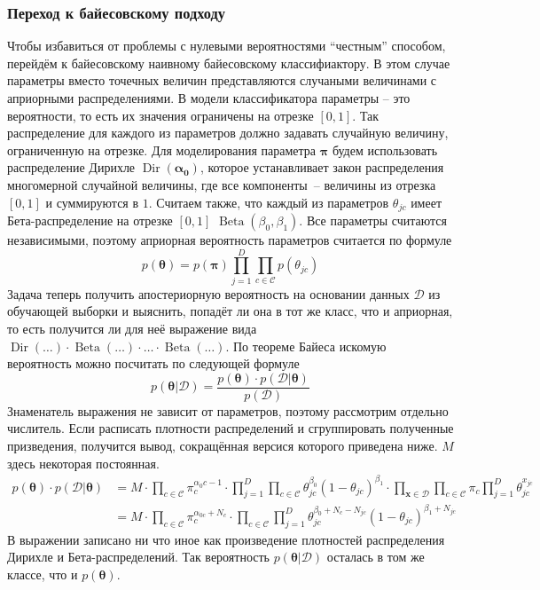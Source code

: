 \subsubsection{Переход к байесовскому подходу}\label{bnb}
Чтобы избавиться от проблемы с нулевыми вероятностями ``честным'' способом, перейдём к байесовскому
наивному байесовскому классифиактору. В этом случае параметры вместо точечных величин представляются
случаными величинами с априорными распределениями. В модели классификатора параметры -- это
вероятности, то есть их значения ограничены на отрезке $[0,1]$. Так распределение для каждого из
параметров должно задавать случайную величину, ограниченную на отрезке. Для моделирования параметра
$\mathbf{\pi}$ будем использовать распределение Дирихле $\operatorname{Dir}(\mathbf{\alpha_0})$, которое
устанавливает закон распределения многомерной случайной величины, где все компоненты~-- величины из
отрезка $[0,1]$ и суммируются в $1$. Считаем также, что каждый из параметров $\theta_{jc}$ имеет
Бета-распределение на отрезке $[0,1]$ $\operatorname{Beta}(\beta_0,\beta_1)$. Все параметры
считаются независимыми, поэтому априорная вероятность параметров считается по формуле
\begin{equation}
  p(\mathbf{\theta}) = p(\mathbf{\pi})\prod_{j=1}^D\prod_{c\in\mathcal{C}}p(\theta_{jc})
  \label{eq:apr}
\end{equation}
Задача теперь получить апостериорную вероятность на основании данных $\mathcal{D}$ из обучающей
выборки и выяснить, попадёт ли она в тот же класс, что и априорная, то есть получится ли для неё
выражение вида
$\operatorname{Dir}(\ldots)\cdot\operatorname{Beta}(\ldots)\cdot\ldots\cdot\operatorname{Beta}(\ldots)$.
По теореме Байеса искомую вероятность можно посчитать по следующей формуле
\begin{equation}
  p(\mathbf{\theta}|\mathcal{D}) =
  \frac{p(\mathbf{\theta})\cdot p(\mathcal{D}|\mathbf{\theta})}{p(\mathcal{D})}
  \label{eq:apo}
\end{equation}
Знаменатель выражения не зависит от параметров, поэтому рассмотрим отдельно числитель. Если
расписать плотности распределений и сгруппировать полученные призведения, получится вывод,
сокращённая версися которого приведена ниже. $M$ здесь некоторая постоянная.
\begin{align}
  p(\mathbf{\theta}) \cdot p(\mathcal{D}|\mathbf{\theta})
  & =  M\cdot\prod_{c\in\mathcal{C}}\pi_c^{\alpha_0c-1}\cdot
  \prod_{j=1}^D\prod_{c\in\mathcal{C}}\theta_{jc}^{\beta_0}(1-\theta_{jc})^{\beta_1}\cdot
  \prod_{\mathbf{x}\in\mathcal{D}}\prod_{c\in\mathcal{C}}\pi_c\prod_{j=1}^D\theta_{jc}^{x_{jc}} \label{eq:plo1}\\
  & = M\cdot\prod_{c\in\mathcal{C}}\pi_c^{\alpha_{0c}+N_c}\cdot
  \prod_{c\in\mathcal{C}}\prod_{j=1}^D\theta_{jc}^{\beta_0+N_c-N_{jc}}(1-\theta_{jc})^{\beta_1+N_{jc}}
  \label{eq:plo2}
\end{align}
В выражении \label{eq:plo2} записано ни что иное как произведение плотностей распределения Дирихле и
Бета-распределений. Так вероятность $p(\mathbf{\theta}|\mathcal{D})$ осталась в том же классе, что и
$p(\mathbf{\theta})$.

